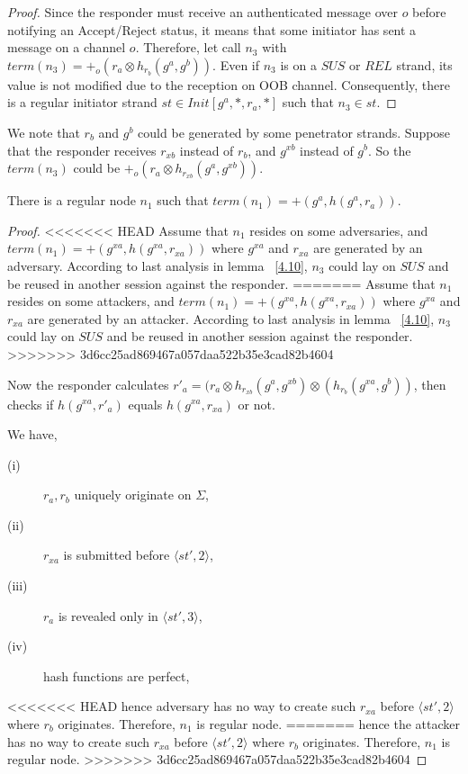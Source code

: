 \begin{itemize}
\begin{proof}
Since the responder must receive an authenticated message over $o$ before notifying an Accept/Reject status, it means that some initiator has sent a message on a channel $o$. Therefore, let call $n_3$ with $term(n_3)= +_o(r_a \otimes h_{r_b}(g^a,g^b))$. Even if $n_3$ is on a $SUS$ or $REL$ strand, its value is not modified due to the reception on OOB channel. Consequently, there is a regular initiator strand $st \in Init[g^a,*, r_a,*]$ such that $n_3 \in st$. 
\end{proof}

We note that $r_b$ and $g^b$ could be generated by some penetrator strands. Suppose that the responder receives $r_{xb}$ instead of $r_b$, and $g^{xb}$ instead of $g^b$. So the $term(n_3)$ could be $+_o(r_a \otimes h_{r_{xb}}(g^a,g^{xb}))$.

\begin{Lemma}\label{4.11}
There is a regular node $n_1$ such that $term(n_1)= +(g^a,h(g^a,r_a))$.
\end{Lemma}

\begin{proof}
<<<<<<< HEAD
Assume that $n_1$ resides on some adversaries, and $term(n_1) = +(g^{xa},h(g^{xa},r_{xa}))$ where $g^{xa}$ and $r_{xa}$ are generated by an adversary. According to last analysis in lemma ~\ref{4.10}, $n_3$ could lay on $SUS$ and be reused in another session against the responder. 
=======
Assume that $n_1$ resides on some attackers, and $term(n_1) = +(g^{xa},h(g^{xa},r_{xa}))$ where $g^{xa}$ and $r_{xa}$ are generated by an attacker. According to last analysis in lemma ~\ref{4.10}, $n_3$ could lay on $SUS$ and be reused in another session against the responder. 
>>>>>>> 3d6cc25ad869467a057daa522b35e3cad82b4604

Now the responder calculates $r'_{a} = (r_a \otimes h_{r_{xb}}(g^a,g^{xb}) \otimes (h_{r_b}(g^{xa},g^b))$, then checks if $h(g^{xa},r'_{a})$ equals $h(g^{xa},r_{xa})$ or not. 

We have,
\begin{description} 
 \item [(i)] $r_a, r_b$ uniquely originate on $\Sigma$, 
 \item [(ii)] $r_{xa}$ is submitted before $\langle st',2\rangle$, 
 \item [(iii)] $r_{a}$ is revealed only in $\langle st',3 \rangle$, 
 \item [(iv)] hash functions are perfect, 
\end{description}
<<<<<<< HEAD
hence adversary has no way to create such $r_{xa}$ before $\langle st',2 \rangle$ where $r_b$ originates. Therefore, $n_1$ is regular node. 
=======
hence the attacker has no way to create such $r_{xa}$ before $\langle st',2 \rangle$ where $r_b$ originates. Therefore, $n_1$ is regular node. 
>>>>>>> 3d6cc25ad869467a057daa522b35e3cad82b4604
 \end{proof}


\end{itemize}

